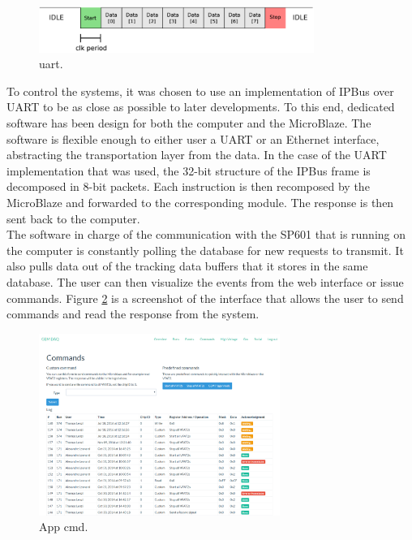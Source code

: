       \begin{figure}[h!]
        \centering
        \includegraphics[width=0.8\textwidth]{img/III-1-arch/uart.png}
        \caption{uart.}
        \label{fig:III-1-uart}
      \end{figure}

      To control the systems, it was chosen to use an implementation of IPBus over UART to be as close as possible to later developments. To this end, dedicated software has been design for both the computer and the MicroBlaze. The software is flexible enough to either user a UART or an Ethernet interface, abstracting the transportation layer from the data. In the case of the UART implementation that was used, the 32-bit structure of the IPBus frame is decomposed in 8-bit packets. Each instruction is then recomposed by the MicroBlaze and forwarded to the corresponding module. The response is then sent back to the computer. \\

      The software in charge of the communication with the SP601 that is running on the computer is constantly polling the database for new requests to transmit. It also pulls data out of the tracking data buffers that it stores in the same database. The user can then visualize the events from the web interface or issue commands. Figure \ref{fig:III-1-app-cmd} is a screenshot of the interface that allows the user to send commands and read the response from the system.

      \begin{figure}[h!]
        \centering
        \includegraphics[width=0.7\textwidth]{img/III-1-arch/app-cmd.png}
        \caption{App cmd.}
        \label{fig:III-1-app-cmd}
      \end{figure}

